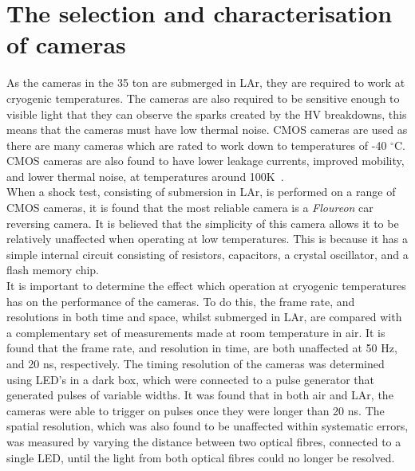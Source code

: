 \section{The selection and characterisation of cameras} \label{sec:CamSelec} %
As the cameras in the 35 ton are submerged in LAr, they are required to work at cryogenic temperatures. The cameras are also required to be sensitive enough to visible light that they can observe the sparks created by the HV breakdowns, this means that the cameras must have low thermal noise. CMOS cameras are used as there are many cameras which are rated to work down to temperatures of -40 $^{\circ}$C. CMOS cameras are also found to have lower leakage currents, improved mobility, and lower thermal noise, at temperatures around 100K~\citep{thermalnoise1,thermalnoise2}. \\

When a shock test, consisting of submersion in LAr, is performed on a range of CMOS cameras, it is found that the most reliable camera is a \emph{Floureon} car reversing camera. It is believed that the simplicity of this camera allows it to be relatively unaffected when operating at low temperatures. This is because it has a simple internal circuit consisting of resistors, capacitors, a crystal oscillator, and a flash memory chip. \\

It is important to determine the effect which operation at cryogenic temperatures has on the performance of the cameras. To do this, the frame rate, and resolutions in both time and space, whilst submerged in LAr, are compared with a complementary set of measurements made at room temperature in air. It is found that the frame rate, and resolution in time, are both unaffected at 50 Hz, and 20 ns, respectively. The timing resolution of the cameras was determined using LED's in a dark box, which were connected to a pulse generator that generated pulses of variable widths. It was found that in both air and LAr, the cameras were able to trigger on pulses once they were longer than 20 ns. The spatial resolution, which was also found to be unaffected within systematic errors, was measured by varying the distance between two optical fibres, connected to a single LED, until the light from both optical fibres could no longer be resolved. \\


